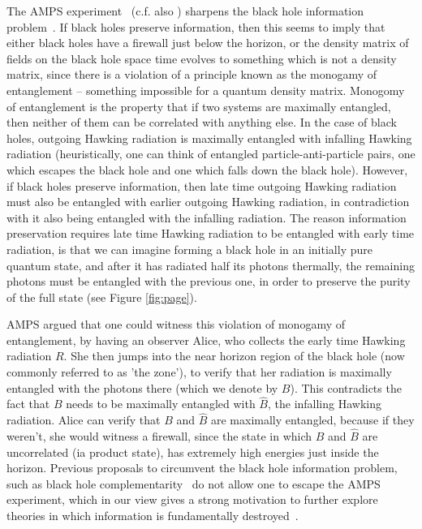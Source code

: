 \documentclass[11pt,a4paper]{article}
\begin{document}
The AMPS experiment~\cite{almheiri2013black} (c.f. also \cite{braunstein2009entangled}) sharpens the black hole information problem~\cite{hawking-bhinfoloss,hawking-unpredictability,preskill-infoloss-note}. If black holes preserve information, then this seems to imply that either black holes have a firewall just below the horizon, or the density matrix of fields on the black hole space time evolves to something which is not a density matrix, since there is a violation of a principle known as the monogamy of entanglement\cite{coffman2000distributed,bennet-monogomy,koashi2004monogamy} -- something impossible for a quantum density matrix. Monogomy of entanglement is the property that if two systems are maximally entangled, then neither of them can be correlated with anything else. In the case of black holes, outgoing Hawking radiation is maximally entangled with infalling Hawking radiation (heuristically, one can think of entangled particle-anti-particle pairs, one which escapes the black hole and one which falls down the black hole). However, if black holes preserve information, then late time outgoing Hawking radiation must also be entangled with earlier outgoing Hawking radiation, in contradiction with it also being entangled with the infalling radiation. The reason information preservation requires late time Hawking radiation to be entangled with early time radiation, is that we can imagine forming a black hole in an initially pure quantum state, and after it has radiated half its photons thermally, the remaining photons must be entangled with the previous one, in order to preserve the purity of the full state (see Figure \ref{fig:page}).

AMPS argued that one could witness this violation of monogamy of entanglement, by having an observer Alice, who collects the early time Hawking radiation $R$. She then jumps into the near horizon region of the black hole (now commonly referred to as 'the zone'), to verify that her radiation is maximally entangled with the photons there (which we denote by $B$). This contradicts the fact that $B$ needs to be maximally entangled with ${\hat B}$, the infalling Hawking radiation. Alice can verify that $B$ and $\hat B$ are maximally entangled, because if they weren't, she would witness a firewall, since the state in which $B$ and $\hat B$ are uncorrelated (ia product state), has extremely high energies just inside the horizon. Previous proposals to circumvent the black hole information problem, such as black hole complementarity~\cite{tHooft-bhcompl,tHooft-bhcompl-string,susskind-bhcompl} do not allow one to escape the AMPS experiment, which in our view gives a strong motivation to further explore theories in which information is fundamentally destroyed~\cite{bps,unruh-wald-onbps,OR-intrinsic,unruh2012decoherence}.
\end{document}
